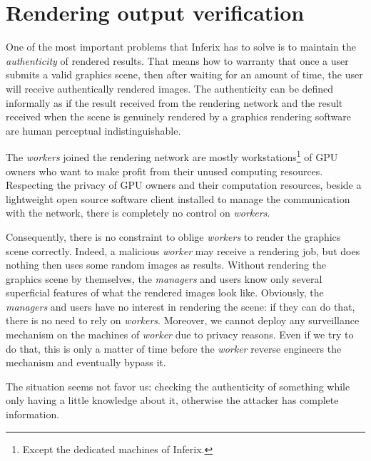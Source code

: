 \section[Rendering output verification]{Rendering output verification}\label{sec:output_verification}
One of the most important problems that Inferix has to solve is to maintain the \emph{authenticity} of rendered results. That means how to warranty that once a user submits a valid graphics scene, then after waiting for an amount of time, the user will receive authentically rendered images. The authenticity can be defined informally as if the result received from the rendering network and the result received when the scene is genuinely rendered by a graphics rendering software are human perceptual indistinguishable.

The \emph{workers} joined the rendering network are mostly workstations\footnote{Except the dedicated machines of Inferix.} of GPU owners who want to make profit from their unused computing resources. Respecting the privacy of GPU owners and their computation resources, beside a lightweight open source software client installed to manage the communication with the network, there is completely no control on \emph{workers}.

Consequently, there is no constraint to oblige \emph{workers} to render the graphics scene correctly. Indeed, a malicious \emph{worker} may receive a rendering job, but does nothing then uses some random images as results. Without rendering the graphics scene by themselves, the \emph{managers} and users know only several superficial features of what the rendered images look like. Obviously, the \emph{managers} and users have no interest in rendering the scene: if they can do that, there is no need to rely on \emph{workers}. Moreover, we cannot deploy any surveillance mechanism on the machines of \emph{worker} due to privacy reasons. Even if we try to do that, this is only a matter of time before the \emph{worker} reverse engineers the mechanism and eventually bypass it.

The situation seems not favor us: checking the authenticity of something while only having a little knowledge about it, otherwise the attacker has complete information.






